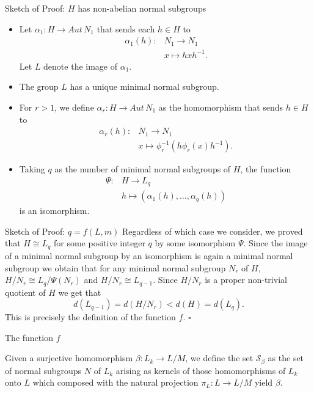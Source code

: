 \documentclass{beamer}
\newcommand{\aut}[1]{Aut\, {#1}}
\begin{document}
\begin{frame}{Sketch of Proof: $H$ has non-abelian normal subgroups}
    \begin{itemize}
        \item Let $\alpha_1 \colon H \rightarrow \aut N_1$ that sends each $h \in H$ to
        \begin{align*}
            \alpha_1(h) \colon &N_1 \rightarrow N_1 \\
                            &x \mapsto hxh^{-1}.
        \end{align*} Let $L$ denote the image of $\alpha_1$.
        \item<2-> The group $L$ has a unique minimal normal subgroup.
        \item<3-> For $r > 1$, we define $\alpha_r \colon H \rightarrow \aut N_1$ as the homomorphism that sends $h \in H$ to
        \begin{align*}
            \alpha_r(h) \colon &N_1 \rightarrow N_1 \\
                            &x \mapsto \phi_r^{-1}(h\phi_r(x)h^{-1}).
        \end{align*}
        \item<4-> Taking $q$ as the number of minimal normal subgroups of $H$, the function
        \begin{align*}
            \Psi \colon &H \rightarrow L_q \\
                        &h \mapsto (\alpha_1(h),\ldots , \alpha_q(h))
        \end{align*}
        is an isomorphism.
    \end{itemize}
\end{frame}

\begin{frame}{Sketch of Proof: $q = f(L, m)$}
    Regardless of which case we consider, we proved that $H \cong L_q$ for some positive integer $q$ by some isomorphism $\Psi$. Since the image of a minimal normal subgroup by an isomorphism is again a minimal normal subgroup we obtain that for any minimal normal subgroup $N_r$ of $H$, $H/N_r \cong L_{q}/\Psi(N_r)$ and $H/N_r \cong L_{q-1}$. Since $H/N_r$ is a proper non-trivial quotient of $H$ we get that
    $$
    d(L_{q-1}) = d(H/N_r) < d(H) = d(L_q).
    $$
    This is precisely the definition of the function $f$. $\square$


\end{frame}

\begin{frame}{The function $f$}
    \begin{definition}
        Given a surjective homomorphism $\beta \colon L_k \rightarrow L/M$, we define the set $\mathscr{S}_\beta$ as the set of normal subgroups $N$ of $L_k$ arising as kernels of those homomorphisms of $L_k$ onto $L$ which composed with the natural projection $\pi_L \colon L \rightarrow L/M$ yield $\beta$.
    \end{definition}
    
\end{frame}
\end{document}
